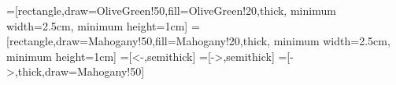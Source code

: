 \documentclass[xetex,dvipsnames]{article}
\begin{document}
\begin{preview}
    =[rectangle,draw=OliveGreen!50,fill=OliveGreen!20,thick,
    minimum width=2.5cm, minimum height=1cm]
    =[rectangle,draw=Mahogany!50,fill=Mahogany!20,thick,
    minimum width=2.5cm, minimum height=1cm]
    =[<-,semithick]
    =[->,semithick]
    =[->,thick,draw=Mahogany!50]
\end{preview}
\end{document}
